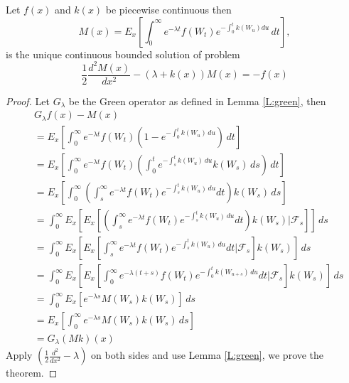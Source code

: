 \begin{theorem} \label{T:kac1}
Let $f(x)$ and $k(x)$ be piecewise continuous then
\begin{equation}
  M(x) = E_x 
        \left[
          \int_0^{\infty} e^{-\lambda t} f(W_t) 
            e^{-\int_0^t k(W_u) du} \, dt 
        \right],
\end{equation} 
is the unique continuous bounded solution of problem
\begin{equation}
  \frac{1}{2} \frac{d^2 M(x)}{dx^2} - (\lambda+k(x)) M(x) = -f(x)  
\end{equation}
\end{theorem}
\begin{proof}
Let $G_{\lambda}$ be the Green operator as defined in Lemma \ref{L:green},
then
\begin{align*}
  & G_{\lambda} f(x) - M(x)  \\
  &= E_x 
     \left[  
       \int_0^{\infty} e^{-\lambda t} f(W_t) 
         \left( 1-e^{-\int_0^t k(W_u)\, du} \right) \, dt
     \right] \\
  &= E_x 
     \left[  
       \int_0^{\infty} e^{-\lambda t} f(W_t) 
         \left( \int_0^t e^{-\int_s^t k(W_u)\, du} k(W_s)\, ds \right) \, dt
     \right] \\
  &= E_x 
     \left[  
       \int_0^{\infty}
         \left( 
           \int_s^{\infty} e^{-\lambda t} f(W_t) e^{-\int_s^t k(W_u)\, du} dt 
         \right)
         k(W_s) \, ds
     \right] \\
  &= \int_0^{\infty} E_x 
       \left[ E_x
         \left[  
           \left( 
             \int_s^{\infty} e^{-\lambda t} f(W_t) e^{-\int_s^t k(W_u)\, du} dt 
           \right)
           k(W_s) | \mathcal{F}_s
         \right] 
       \right] \, ds \\
  &= \int_0^{\infty} E_x 
       \left[ E_x
         \left[  
           \int_s^{\infty} e^{-\lambda t} f(W_t) e^{-\int_s^t k(W_u)\, du} dt 
           | \mathcal{F}_s
         \right] k(W_s)
       \right] \, ds \\
  &= \int_0^{\infty} E_x 
       \left[ E_x
         \left[  
           \int_0^{\infty} e^{-\lambda (t+s)} f(W_t) 
             e^{-\int_0^t k(W_{u+s})\, du} dt | \mathcal{F}_s
         \right] k(W_s)
       \right] \, ds \\
  &= \int_0^{\infty} E_x 
       \left[ e^{-\lambda s} M(W_s) k(W_s) \right] \, ds \\
  &= E_x \left[ \int_0^{\infty} e^{-\lambda s} M(W_s) k(W_s) \, ds\right] \\
  &= G_{\lambda} (Mk)(x)
\end{align*}
Apply $\left( \frac{1}{2} \frac{d^2}{dx^2} - \lambda \right)$ on both sides and use Lemma 
\ref{L:green}, we prove the theorem.
\end{proof}


